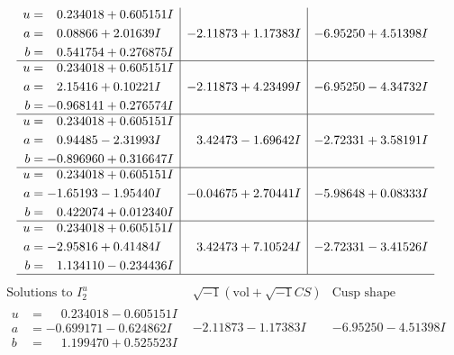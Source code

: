 \documentclass[1p]{elsarticle_modified}
\theoremstyle{definition}
\newcommand{\I}{\sqrt{-1}}
\begin{document}
$$\begin{array}{c|c|c}
\begin{aligned}
u &= \phantom{-}0.234018 + 0.605151 I \\
a &= \phantom{-}0.08866 + 2.01639 I \\
b &= \phantom{-}0.541754 + 0.276875 I\end{aligned}
 & -2.11873 + 1.17383 I & -6.95250 + 4.51398 I \\ \hline\begin{aligned}
u &= \phantom{-}0.234018 + 0.605151 I \\
a &= \phantom{-}2.15416 + 0.10221 I \\
b &= -0.968141 + 0.276574 I\end{aligned}
 & -2.11873 + 4.23499 I & -6.95250 - 4.34732 I \\ \hline\begin{aligned}
u &= \phantom{-}0.234018 + 0.605151 I \\
a &= \phantom{-}0.94485 - 2.31993 I \\
b &= -0.896960 + 0.316647 I\end{aligned}
 & \phantom{-}3.42473 - 1.69642 I & -2.72331 + 3.58191 I \\ \hline\begin{aligned}
u &= \phantom{-}0.234018 + 0.605151 I \\
a &= -1.65193 - 1.95440 I \\
b &= \phantom{-}0.422074 + 0.012340 I\end{aligned}
 & -0.04675 + 2.70441 I & -5.98648 + 0.08333 I \\ \hline\begin{aligned}
u &= \phantom{-}0.234018 + 0.605151 I \\
a &= -2.95816 + 0.41484 I \\
b &= \phantom{-}1.134110 - 0.234436 I\end{aligned}
 & \phantom{-}3.42473 + 7.10524 I & -2.72331 - 3.41526 I\\
 \hline 
 \end{array}$$\newpage$$\begin{array}{c|c|c}  
\text{Solutions to }I^u_{2}& \I (\text{vol} + \sqrt{-1}CS) & \text{Cusp shape}\\
 \hline 
\begin{aligned}
u &= \phantom{-}0.234018 - 0.605151 I \\
a &= -0.699171 - 0.624862 I \\
b &= \phantom{-}1.199470 + 0.525523 I\end{aligned}
 & -2.11873 - 1.17383 I & -6.95250 - 4.51398 I \\ \hline\begin{aligned}

\end{aligned}
\end{array}$$
\end{document}

